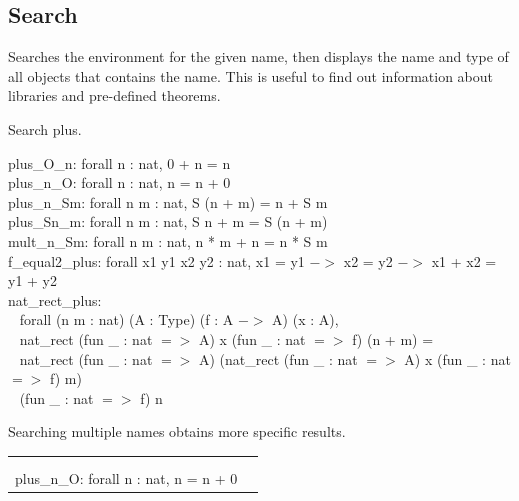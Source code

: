 \newpage
\subsection{Search} \label{search}
Searches the environment for the given name, then displays the name and type of all objects that contains the name. 
This is useful to find out information about libraries and pre-defined theorems. 

\begin{code}
	Search plus.
\end{code}
\begin{msg}
	plus\_O\_n: forall n : nat, 0 + n = n	\\
	plus\_n\_O: forall n : nat, n = n + 0	\\
	plus\_n\_Sm: forall n m : nat, S (n + m) = n + S m	\\
	plus\_Sn\_m: forall n m : nat, S n + m = S (n + m)	\\
	mult\_n\_Sm: forall n m : nat, n * m + n = n * S m		\\
	f\_equal2\_plus: forall x1 y1 x2 y2 : nat, x1 = y1 $->$ x2 = y2 $->$ x1 + x2 = y1 + y2	\\
	nat\_rect\_plus:	\\ \-\ \quad
	  forall (n m : nat) (A : Type) (f : A $->$ A) (x : A),	\\ \-\ \quad
	  nat\_rect (fun \_ : nat $=>$ A) x (fun \_ : nat $=>$ f) (n + m) =	\\ \-\ \quad
	  nat\_rect (fun \_ : nat $=>$ A) (nat\_rect (fun \_ : nat $=>$ A) x (fun \_ : nat $=>$ f) m)	
	  \\ \-\ \qquad
	    (fun \_ : nat $=>$ f) n
\end{msg}

\noindent 
Searching multiple names obtains more specific results. 

\hspace{-1cm}
\begin{tabular}{p{8cm} p{8cm}}
\begin{code}
	Search plus 0. \\
\end{code}&
\begin{msg}
	plus\_O\_n: forall n : nat, 0 + n = n	\\
	plus\_n\_O: forall n : nat, n = n + 0
\end{msg}
\end{tabular}

